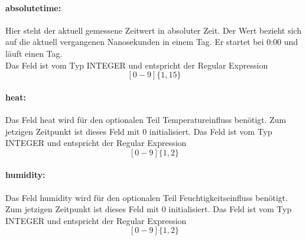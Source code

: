     \paragraph{absolutetime:}
    Hier steht der aktuell gemessene Zeitwert in absoluter Zeit. Der Wert bezieht sich auf die aktuell vergangenen Nanosekunden in einem Tag. Er startet bei 0:00 und läuft einen Tag.\\
    Das Feld ist vom Typ INTEGER und entspricht der Regular Expression
    $$[0-9]\{1,15\}$$
    \paragraph{heat:}
    Das Feld heat wird für den optionalen Teil Temperatureinfluss benötigt. Zum jetzigen Zeitpunkt ist dieses Feld mit 0 initialisiert.
    Das Feld ist vom Typ INTEGER und entspricht der Regular Expression
    $$[0-9]\{1,2\}$$
    \paragraph{humidity:}
    Das Feld humidity wird für den optionalen Teil Feuchtigkeitseinfluss benötigt. Zum jetzigen Zeitpunkt ist dieses Feld mit 0 initialisiert.
    Das Feld ist vom Typ INTEGER und entspricht der Regular Expression
    $$[0-9]\{1,2\}$$
